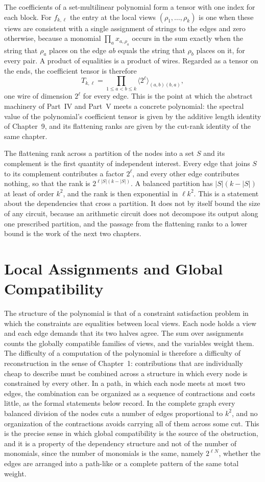 \documentclass[11pt,letterpaper]{report}
\theoremstyle{plain}
\theoremstyle{definition}
\theoremstyle{remark}
\begin{document}
The coefficients of a set-multilinear polynomial form a tensor with one index for each block. For $f_{k,\ell}$ the entry at the local views $(\rho_1,\ldots,\rho_k)$ is one when these views are consistent with a single assignment of strings to the edges and zero otherwise, because a monomial $\prod_ax_{a,\rho_a}$ occurs in the sum exactly when the string that $\rho_a$ places on the edge $ab$ equals the string that $\rho_b$ places on it, for every pair. A product of equalities is a product of wires. Regarded as a tensor on the ends, the coefficient tensor is therefore
\[
T_{k,\ell}=\prod_{1\le a<b\le k}\langle2^{\ell}\rangle_{(a,b)(b,a)},
\]
one wire of dimension $2^{\ell}$ for every edge. This is the point at which the abstract machinery of Part~IV and Part~V meets a concrete polynomial: the spectral value of the polynomial's coefficient tensor is given by the additive length identity of Chapter~9, and its flattening ranks are given by the cut-rank identity of the same chapter.

The flattening rank across a partition of the nodes into a set $S$ and its complement is the first quantity of independent interest. Every edge that joins $S$ to its complement contributes a factor $2^{\ell}$, and every other edge contributes nothing, so that the rank is $2^{\ell|S|(k-|S|)}$. A balanced partition has $|S|(k-|S|)$ at least of order $k^2$, and the rank is then exponential in $\ell k^2$. This is a statement about the dependencies that cross a partition. It does not by itself bound the size of any circuit, because an arithmetic circuit does not decompose its output along one prescribed partition, and the passage from the flattening ranks to a lower bound is the work of the next two chapters.

\section{Local Assignments and Global Compatibility}

The structure of the polynomial is that of a constraint satisfaction problem in which the constraints are equalities between local views. Each node holds a view and each edge demands that its two halves agree. The sum over assignments counts the globally compatible families of views, and the variables weight them. The difficulty of a computation of the polynomial is therefore a difficulty of reconstruction in the sense of Chapter~1: contributions that are individually cheap to describe must be combined across a structure in which every node is constrained by every other. In a path, in which each node meets at most two edges, the combination can be organized as a sequence of contractions and costs little, as the formal statements below record. In the complete graph every balanced division of the nodes cuts a number of edges proportional to $k^2$, and no organization of the contractions avoids carrying all of them across some cut. This is the precise sense in which global compatibility is the source of the obstruction, and it is a property of the dependency structure and not of the number of monomials, since the number of monomials is the same, namely $2^{\ell N}$, whether the edges are arranged into a path-like or a complete pattern of the same total weight.
\end{document}
